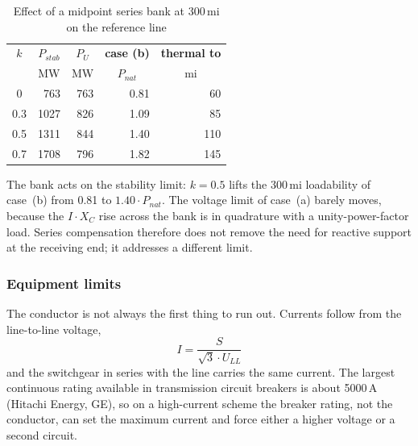 \begin{table}[!ht]
  \centering
  \begin{tabular}{@{}c r r r r@{}}
    \toprule
    \textbf{$k$} & \multicolumn{1}{c}{\textbf{$P_{stab}$}}
      & \multicolumn{1}{c}{\textbf{$P_U$}}
      & \multicolumn{1}{c}{\textbf{case (b)}}
      & \multicolumn{1}{c}{\textbf{thermal to}} \\
    & \multicolumn{1}{c}{MW} & \multicolumn{1}{c}{MW}
      & \multicolumn{1}{c}{$P_{nat}$} & \multicolumn{1}{c}{mi} \\
    \midrule
    0   &  763 & 763 & 0.81 &  60 \\
    0.3 & 1027 & 826 & 1.09 &  85 \\
    0.5 & 1311 & 844 & 1.40 & 110 \\
    0.7 & 1708 & 796 & 1.82 & 145 \\
    \bottomrule
  \end{tabular}
  \caption{Effect of a midpoint series bank at 300\,mi on the reference line}
  \label{tab:tl-k}
\end{table}

The bank acts on the stability limit: $k = 0.5$ lifts the 300\,mi
loadability of case~(b) from 0.81 to $1.40 \cdot P_{nat}$. The voltage limit
of case~(a) barely moves, because the $I \cdot X_C$ rise across the bank is
in quadrature with a unity-power-factor load. Series compensation therefore
does not remove the need for reactive support at the receiving end; it
addresses a different limit.

\subsubsection{Equipment limits}
\label{sec:limits-equipment}

The conductor is not always the first thing to run out. Currents follow from
the line-to-line voltage,
\begin{equation}
  I = \frac{S}{\sqrt{3} \cdot U_{LL}}
  \label{eq:lim-current}
\end{equation}
and the switchgear in series with the line carries the same current. The
largest continuous rating available in transmission circuit breakers is
about 5000\,A (Hitachi Energy, GE), so on a high-current scheme the breaker
rating, not the conductor, can set the maximum current and force either a
higher voltage or a second circuit.

\FloatBarrier
